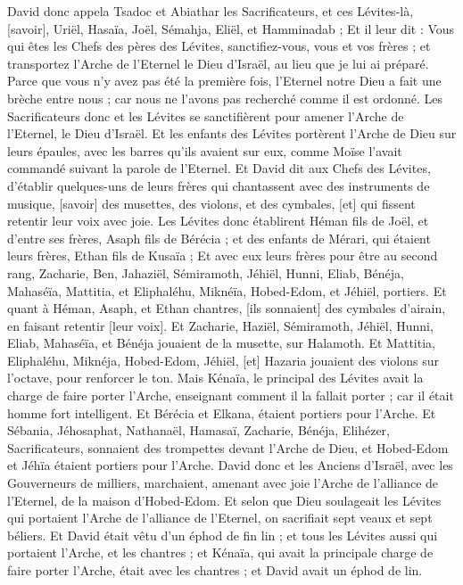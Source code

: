 \begin{multicols}{2}
David donc appela Tsadoc et Abiathar les Sacrificateurs, et ces Lévites-là, [savoir], Uriël, Hasaïa, Joël, Sémahja, Eliël, et Hamminadab ;
Et il leur dit : Vous qui êtes les Chefs des pères des Lévites, sanctifiez-vous, vous et vos frères ; et transportez l'Arche de l'Eternel le Dieu d'Israël, au lieu que je lui ai préparé.
Parce que vous n'y avez pas été la première fois, l'Eternel notre Dieu a fait une brèche entre nous ; car nous ne l'avons pas recherché comme il est ordonné.
Les Sacrificateurs donc et les Lévites se sanctifièrent pour amener l'Arche de l'Eternel, le Dieu d'Israël.
Et les enfants des Lévites portèrent l'Arche de Dieu sur leurs épaules, avec les barres qu'ils avaient sur eux, comme Moïse l'avait commandé suivant la parole de l'Eternel.
Et David dit aux Chefs des Lévites, d'établir quelques-uns de leurs frères qui chantassent avec des instruments de musique, [savoir] des musettes, des violons, et des cymbales, [et] qui fissent retentir leur voix avec joie.
Les Lévites donc établirent Héman fils de Joël, et d'entre ses frères, Asaph fils de Bérécia ; et des enfants de Mérari, qui étaient leurs frères, Ethan fils de Kusaïa ;
Et avec eux leurs frères pour être au second rang, Zacharie, Ben, Jahaziël, Sémiramoth, Jéhiël, Hunni, Eliab, Bénéja, Mahaséïa, Mattitia, et Eliphaléhu, Miknéïa, Hobed-Edom, et Jéhiël, portiers.
Et quant à Héman, Asaph, et Ethan chantres, [ils sonnaient] des cymbales d'airain, en faisant retentir [leur voix].
Et Zacharie, Haziël, Sémiramoth, Jéhiël, Hunni, Eliab, Mahaséïa, et Bénéja jouaient de la musette, sur Halamoth.
Et Mattitia, Eliphaléhu, Miknéja, Hobed-Edom, Jéhiël, [et] Hazaria jouaient des violons sur l'octave, pour renforcer le ton.
Mais Kénaïa, le principal des Lévites avait la charge de faire porter l'Arche, enseignant comment il la fallait porter ; car il était homme fort intelligent.
Et Bérécia et Elkana, étaient portiers pour l'Arche.
Et Sébania, Jéhosaphat, Nathanaël, Hamasaï, Zacharie, Bénéja, Elihézer, Sacrificateurs, sonnaient des trompettes devant l'Arche de Dieu, et Hobed-Edom et Jéhïa étaient portiers pour l'Arche.
David donc et les Anciens d'Israël, avec les Gouverneurs de milliers, marchaient, amenant avec joie l'Arche de l'alliance de l'Eternel, de la maison d'Hobed-Edom.
Et selon que Dieu soulageait les Lévites qui portaient l'Arche de l'alliance de l'Eternel, on sacrifiait sept veaux et sept béliers.
Et David était vêtu d'un éphod de fin lin ; et tous les Lévites aussi qui portaient l'Arche, et les chantres ; et Kénaïa, qui avait la principale charge de faire porter l'Arche, était avec les chantres ; et David avait un éphod de lin.

\end{multicols}
